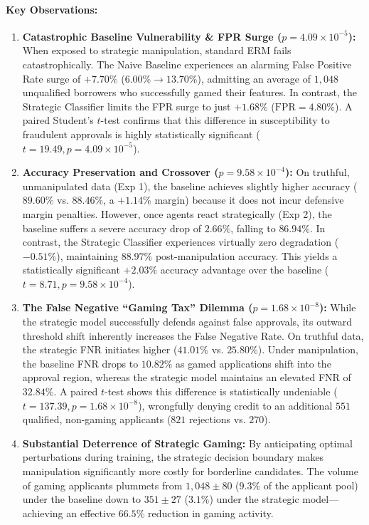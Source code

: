 \documentclass[10pt, letterpaper]{article}
\begin{document}
\paragraph{Key Observations:}
\begin{enumerate}[leftmargin=*]
    \item \textbf{Catastrophic Baseline Vulnerability \& FPR Surge ($p = 4.09 \times 10^{-5}$):} When exposed to strategic manipulation, standard ERM fails catastrophically. The Naive Baseline experiences an alarming False Positive Rate surge of $+7.70\%$ ($6.00\% \to 13.70\%$), admitting an average of $1{,}048$ unqualified borrowers who successfully gamed their features. In contrast, the Strategic Classifier limits the FPR surge to just $+1.68\%$ ($\text{FPR} = 4.80\%$). A paired Student's $t$-test confirms that this difference in susceptibility to fraudulent approvals is highly statistically significant ($t = 19.49, p = 4.09 \times 10^{-5}$).
    \item \textbf{Accuracy Preservation and Crossover ($p = 9.58 \times 10^{-4}$):} On truthful, unmanipulated data (Exp 1), the baseline achieves slightly higher accuracy ($89.60\%$ vs. $88.46\%$, a $+1.14\%$ margin) because it does not incur defensive margin penalties. However, once agents react strategically (Exp 2), the baseline suffers a severe accuracy drop of $2.66\%$, falling to $86.94\%$. In contrast, the Strategic Classifier experiences virtually zero degradation ($-0.51\%$), maintaining $88.97\%$ post-manipulation accuracy. This yields a statistically significant $+2.03\%$ accuracy advantage over the baseline ($t = 8.71, p = 9.58 \times 10^{-4}$).
    \item \textbf{The False Negative ``Gaming Tax'' Dilemma ($p = 1.68 \times 10^{-8}$):} While the strategic model successfully defends against false approvals, its outward threshold shift inherently increases the False Negative Rate. On truthful data, the strategic FNR initiates higher ($41.01\%$ vs. $25.80\%$). Under manipulation, the baseline FNR drops to $10.82\%$ as gamed applications shift into the approval region, whereas the strategic model maintains an elevated FNR of $32.84\%$. A paired $t$-test shows this difference is statistically undeniable ($t = 137.39, p = 1.68 \times 10^{-8}$), wrongfully denying credit to an additional $551$ qualified, non-gaming applicants ($821$ rejections vs. $270$).
    \item \textbf{Substantial Deterrence of Strategic Gaming:} By anticipating optimal perturbations during training, the strategic decision boundary makes manipulation significantly more costly for borderline candidates. The volume of gaming applicants plummets from $1{,}048 \pm 80$ ($9.3\%$ of the applicant pool) under the baseline down to $351 \pm 27$ ($3.1\%$) under the strategic model—achieving an effective $66.5\%$ reduction in gaming activity.
\end{enumerate}
\end{document}
